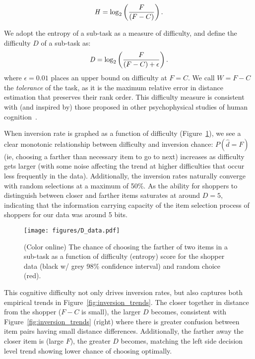 \documentclass[aps,pre,twocolumn,groupedaddress]{revtex4-2}
\begin{document}
\begin{equation}
 \label{eq:entropy}
  \text{\textit{H}} = \log_2\left(\frac{F}{(F-C)}\right).
\end{equation}

We adopt the entropy of a sub-task as a measure of difficulty, and define the difficulty $D$ of a sub-task as:
\begin{equation}
 \label{eq:difficulty}
  \text{\textit{D}} = \log_2\left(\frac{F}{(F-C) + \epsilon}\right).
\end{equation}
\noindent where $\epsilon = 0.01$ places an upper bound on difficulty at $F=C$. We call $W = F-C$ the \textit{tolerance} of the task, as it is the maximum relative error in distance estimation that preserves their rank order. 
This difficulty measure is consistent with (and inspired by) those proposed in other psychophysical studies of human cognition~\cite{moyer1967time,fitts1964information}. 

When inversion rate is graphed as a function of difficulty (Figure~\ref{fig:D_data}), we see a clear monotonic relationship between difficulty and inversion chance: $P(\hat{d} = F)$ (ie, choosing a farther than necessary item to go to next) increases as difficulty gets larger (with some noise affecting the trend at higher difficulties that occur less frequently in the data). Additionally, the inversion rates naturally converge with random selections at a maximum of 50\%. As the ability for shoppers to distinguish between closer and farther items saturates at around $D=5$, indicating that the information carrying capacity of the item selection process of shoppers for our data was around 5 bits.
\begin{figure}
    \centering
    \texttt{[image: figures/D\_data.pdf]}%
    \caption{(Color online) The chance of choosing the farther of two items in a sub-task as a function of difficulty (entropy) score for the shopper data (black w/ grey 98\% confidence interval) and random choice (red).\label{fig:D_data}}
\end{figure}


This cognitive difficulty not only drives inversion rates, but also captures both empirical trends in Figure~\ref{fig:inversion_trends}. The closer together in distance from the shopper ($F-C$ is small), the larger $D$ becomes, consistent with Figure~\ref{fig:inversion_trends} (right) where there is greater confusion between item pairs having small distance differences. Additionally, the farther away the closer item is (large $F$), the greater $D$ becomes, matching the left side decision level trend showing lower chance of choosing optimally.
\end{document}
